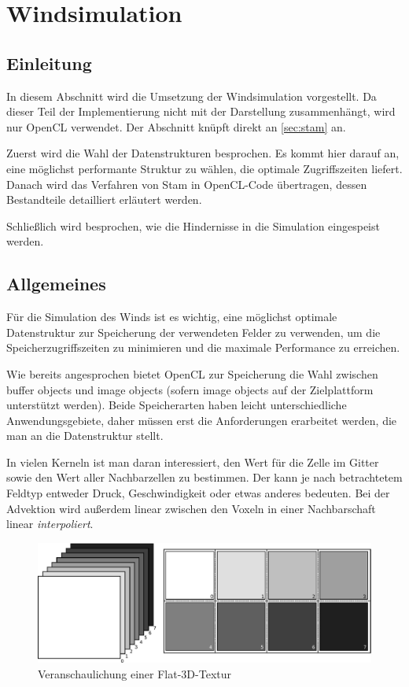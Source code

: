 \section{Windsimulation}
\label{sec:implementation_wind}

\subsection{Einleitung}

In diesem Abschnitt wird die Umsetzung der Windsimulation
vorgestellt. Da dieser Teil der Implementierung nicht mit der
Darstellung zusammenhängt, wird nur OpenCL verwendet. Der Abschnitt
knüpft direkt an \autoref{sec:stam} an.

Zuerst wird die Wahl der Datenstrukturen besprochen. Es kommt hier
darauf an, eine möglichst performante Struktur zu wählen, die optimale
Zugriffszeiten liefert. Danach wird das Verfahren von Stam in
OpenCL-Code übertragen, dessen Bestandteile detailliert erläutert
werden.

Schließlich wird besprochen, wie die Hindernisse in die
Simulation eingespeist werden.

\subsection{Allgemeines}

Für die Simulation des Winds ist es wichtig, eine möglichst optimale
Datenstruktur zur Speicherung der verwendeten Felder zu verwenden, um
die Speicherzugriffszeiten zu minimieren und die maximale Performance zu
erreichen.

Wie bereits angesprochen bietet OpenCL zur Speicherung die Wahl
zwischen buffer objects und image objects (sofern image objects auf der
Zielplattform unterstützt werden). Beide Speicherarten haben leicht
unterschiedliche Anwendungsgebiete, daher müssen erst die
Anforderungen erarbeitet werden, die man an die Datenstruktur
stellt.

In vielen Kerneln ist man daran interessiert, den Wert für die
 Zelle im Gitter sowie den Wert aller
Nachbarzellen zu bestimmen. Der  kann je nach
betrachtetem Feldtyp entweder Druck, Geschwindigkeit oder etwas
anderes bedeuten. Bei der Advektion wird außerdem linear zwischen den
Voxeln in einer Nachbarschaft linear \emph{interpoliert}.

\begin{figure}[h]
\centering
\includegraphics[width=14cm]{images/flat_texture}
\caption{Veranschaulichung einer Flat-3D-Textur}
\label{fig:implementation_flat_3d_texture}
\end{figure}


